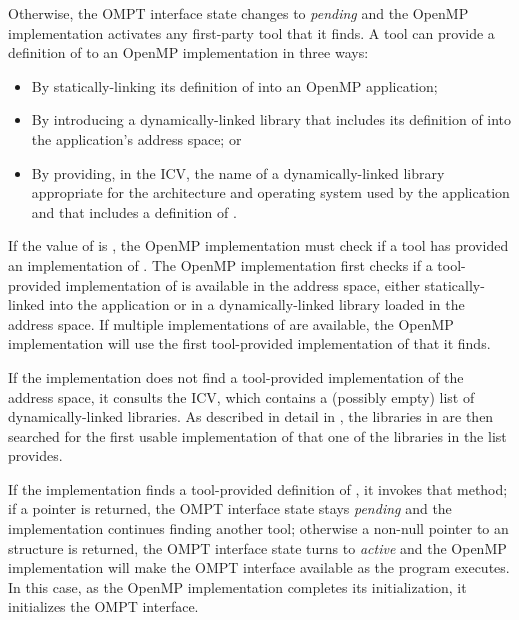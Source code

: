 Otherwise, the OMPT interface state changes to \emph{pending} and the 
OpenMP implementation activates any first-party tool that it finds. A 
tool can provide a definition of  to an OpenMP 
implementation in three ways:

\begin{itemize}
\item By statically-linking its definition of  into an
      OpenMP application;
\item By introducing a dynamically-linked library that includes its definition
      of  into the application's address space; or
\item By providing, in the  ICV, the name of a 
      dynamically-linked library appropriate for the architecture and 
      operating system used by the application and that includes a
      definition of .
\end{itemize}

If the value of  is , the OpenMP implementation 
must check if a tool has provided an implementation of . 
The OpenMP implementation first checks if a tool-provided implementation of 
 is available in the address space, either 
statically-linked into the application or in a dynamically-linked library 
loaded in the address space. If multiple implementations of 
 are available, the OpenMP implementation will use 
the first tool-provided implementation of  that it finds.

If the implementation does not find a tool-provided implementation of 
 the address space, it consults the 
 ICV, which contains a (possibly empty) list of 
dynamically-linked libraries. As  described in detail in 
, the libraries in  
are then searched for the first usable implementation of 
 that one of the libraries in the list provides.

If the implementation finds a tool-provided definition of ,
it invokes that method; if a  pointer is returned, the OMPT interface 
state stays \emph{pending} and the implementation continues finding another tool; 
otherwise a non-null pointer to an  
structure is returned, the OMPT interface state turns to \emph{active} and the 
OpenMP implementation will make the OMPT interface available as the program 
executes.
In this case, as the OpenMP implementation completes its initialization, it 
initializes the OMPT interface.

